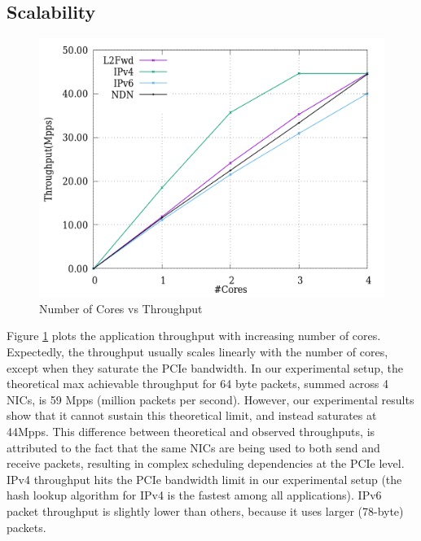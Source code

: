 \subsection{Scalability}
\label{scalability}
\begin{figure}[ht]
\includegraphics[width = \linewidth]{Figures/cores.png}
\caption{Number of Cores vs Throughput}
\label{cores}
\end{figure}
Figure \ref{cores} plots the application throughput with increasing number of cores.
Expectedly, the throughput usually scales linearly with the number of cores, except when
they saturate the PCIe bandwidth. In our experimental setup, the theoretical max achievable
throughput for 64 byte packets, summed across 4 NICs, is 59 Mpps (million packets per second). However, our
experimental results show that it cannot sustain this theoretical limit, and instead
saturates at 44Mpps. This difference between theoretical and observed throughputs,
is attributed to the fact that the same NICs are being used to both send and
receive packets, resulting in complex scheduling dependencies at the PCIe level.
IPv4 throughput hits the PCIe bandwidth limit in our experimental setup (the hash
lookup algorithm for IPv4 is the fastest among all applications).
IPv6 packet throughput is slightly lower than others, because it uses larger
(78-byte) packets.

%

